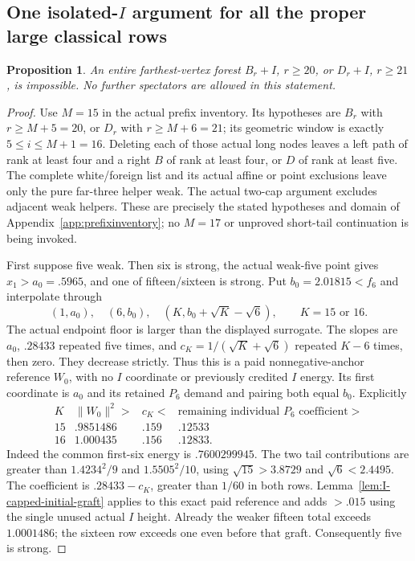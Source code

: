 \documentclass[11pt]{article}
\newtheorem{proposition}[theorem]{Proposition}
\theoremstyle{definition}
\theoremstyle{remark}
\newcommand{\norm}[1]{\lVert #1\rVert}
\begin{document}
\subsection{One isolated-$I$ argument for all the proper large classical rows}
\label{app:tail:classicalI}
\begin{proposition}
\label{app:tail:prop:classicalI}
An entire farthest-vertex forest $B_r+I$, $r\ge20$, or $D_r+I$,
$r\ge21$, is impossible. No further spectators are allowed in this
statement.
\end{proposition}
\begin{proof}
Use $M=15$ in the actual prefix inventory. Its hypotheses are
$B_r$ with $r\ge M+5=20$, or $D_r$ with $r\ge M+6=21$;
its geometric window is exactly $5\le i\le M+1=16$.
Deleting each of those actual long nodes leaves a left path of
rank at least four and a right $B$ of rank at least four, or $D$
of rank at least five. The complete white/foreign list and its
actual affine or point exclusions leave only the pure far-three
helper weak. The actual two-cap argument excludes adjacent weak
helpers. These are precisely the stated hypotheses and domain of
Appendix~\ref{app:prefixinventory}; no $M=17$ or unproved short-tail
continuation is being invoked.

First suppose five weak. Then six is strong, the actual weak-five
point gives $x_1>a_0=.5965$, and one of fifteen/sixteen is strong.
Put $b_0=2.01815<f_6$ and interpolate through
\[
 (1,a_0),\quad(6,b_0),\quad
 (K,b_0+\sqrt K-\sqrt6),\qquad K=15\text{ or }16.
\]
The actual endpoint floor is larger than the displayed surrogate.
The slopes are $a_0$, $.28433$ repeated five times, and
$c_K=1/(\sqrt K+\sqrt6)$ repeated $K-6$ times, then zero.
They decrease strictly. Thus this is a paid nonnegative-anchor
reference $W_0$, with no $I$ coordinate or previously credited
$I$ energy. Its first coordinate is $a_0$ and its retained
$P_6$ demand and pairing both equal $b_0$. Explicitly
\[
\begin{array}{c|c|c|c}
K&\norm{W_0}^2>&c_K<&
 \text{remaining individual }P_6\text{ coefficient}>\\\hline
15&.9851486&.159&.12533\\
16&1.000435&.156&.12833 .
\end{array}
\]
Indeed the common first-six energy is $.7600299945$.
The two tail contributions are greater than $1.4234^2/9$ and
$1.5505^2/10$, using $\sqrt{15}>3.8729$ and $\sqrt6<2.4495$.
The coefficient is $.28433-c_K$, greater than $1/60$ in both rows.
Lemma~\ref{lem:I-capped-initial-graft} applies to this exact paid
reference and adds $>.015$ using the single unused actual $I$ height.
Already the weaker fifteen total exceeds $1.0001486$; the sixteen
row exceeds one even before that graft. Consequently five is strong.


\end{proof}
\end{document}

